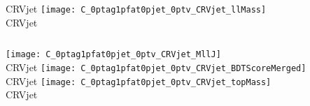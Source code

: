 \begin{frame}{}
\begin{columns}[c]
    CRVjet 
    \centering\texttt{[image: C\_0ptag1pfat0pjet\_0ptv\_CRVjet\_llMass]}\\
    CRVjet 
  \end{columns}
  \begin{columns}[c]
    \centering\texttt{[image: C\_0ptag1pfat0pjet\_0ptv\_CRVjet\_MllJ]}\\
    CRVjet 
    \centering\texttt{[image: C\_0ptag1pfat0pjet\_0ptv\_CRVjet\_BDTScoreMerged]}\\
    CRVjet 
    \centering\texttt{[image: C\_0ptag1pfat0pjet\_0ptv\_CRVjet\_topMass]}\\
    CRVjet 
  \end{columns}
\end{frame}

